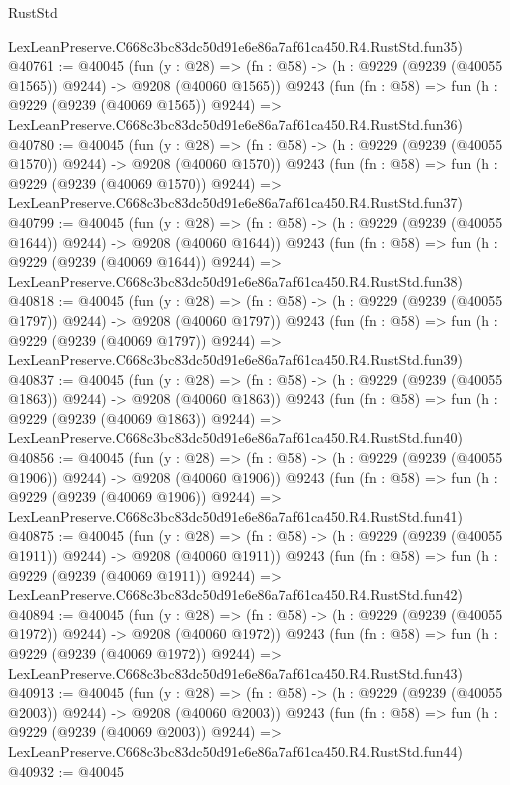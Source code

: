 \begin{lexlean}{RustStd}
\begin{coremodule}
    LexLeanPreserve.C668c3bc83dc50d91e6e86a7af61ca450.R4.RustStd.fun35)
@40761 := @40045
    (fun (y : @28) =>
    (fn : @58) -> (h : @9229 (@9239 (@40055 @1565)) @9244) -> @9208 (@40060 @1565))
    @9243
    (fun (fn : @58) =>
    fun (h : @9229 (@9239 (@40069 @1565)) @9244) =>
    LexLeanPreserve.C668c3bc83dc50d91e6e86a7af61ca450.R4.RustStd.fun36)
@40780 := @40045
    (fun (y : @28) =>
    (fn : @58) -> (h : @9229 (@9239 (@40055 @1570)) @9244) -> @9208 (@40060 @1570))
    @9243
    (fun (fn : @58) =>
    fun (h : @9229 (@9239 (@40069 @1570)) @9244) =>
    LexLeanPreserve.C668c3bc83dc50d91e6e86a7af61ca450.R4.RustStd.fun37)
@40799 := @40045
    (fun (y : @28) =>
    (fn : @58) -> (h : @9229 (@9239 (@40055 @1644)) @9244) -> @9208 (@40060 @1644))
    @9243
    (fun (fn : @58) =>
    fun (h : @9229 (@9239 (@40069 @1644)) @9244) =>
    LexLeanPreserve.C668c3bc83dc50d91e6e86a7af61ca450.R4.RustStd.fun38)
@40818 := @40045
    (fun (y : @28) =>
    (fn : @58) -> (h : @9229 (@9239 (@40055 @1797)) @9244) -> @9208 (@40060 @1797))
    @9243
    (fun (fn : @58) =>
    fun (h : @9229 (@9239 (@40069 @1797)) @9244) =>
    LexLeanPreserve.C668c3bc83dc50d91e6e86a7af61ca450.R4.RustStd.fun39)
@40837 := @40045
    (fun (y : @28) =>
    (fn : @58) -> (h : @9229 (@9239 (@40055 @1863)) @9244) -> @9208 (@40060 @1863))
    @9243
    (fun (fn : @58) =>
    fun (h : @9229 (@9239 (@40069 @1863)) @9244) =>
    LexLeanPreserve.C668c3bc83dc50d91e6e86a7af61ca450.R4.RustStd.fun40)
@40856 := @40045
    (fun (y : @28) =>
    (fn : @58) -> (h : @9229 (@9239 (@40055 @1906)) @9244) -> @9208 (@40060 @1906))
    @9243
    (fun (fn : @58) =>
    fun (h : @9229 (@9239 (@40069 @1906)) @9244) =>
    LexLeanPreserve.C668c3bc83dc50d91e6e86a7af61ca450.R4.RustStd.fun41)
@40875 := @40045
    (fun (y : @28) =>
    (fn : @58) -> (h : @9229 (@9239 (@40055 @1911)) @9244) -> @9208 (@40060 @1911))
    @9243
    (fun (fn : @58) =>
    fun (h : @9229 (@9239 (@40069 @1911)) @9244) =>
    LexLeanPreserve.C668c3bc83dc50d91e6e86a7af61ca450.R4.RustStd.fun42)
@40894 := @40045
    (fun (y : @28) =>
    (fn : @58) -> (h : @9229 (@9239 (@40055 @1972)) @9244) -> @9208 (@40060 @1972))
    @9243
    (fun (fn : @58) =>
    fun (h : @9229 (@9239 (@40069 @1972)) @9244) =>
    LexLeanPreserve.C668c3bc83dc50d91e6e86a7af61ca450.R4.RustStd.fun43)
@40913 := @40045
    (fun (y : @28) =>
    (fn : @58) -> (h : @9229 (@9239 (@40055 @2003)) @9244) -> @9208 (@40060 @2003))
    @9243
    (fun (fn : @58) =>
    fun (h : @9229 (@9239 (@40069 @2003)) @9244) =>
    LexLeanPreserve.C668c3bc83dc50d91e6e86a7af61ca450.R4.RustStd.fun44)
@40932 := @40045

\end{coremodule}
\end{lexlean}
